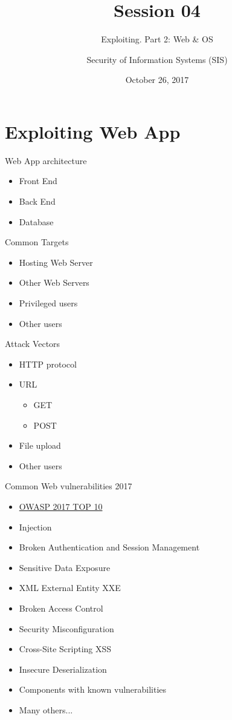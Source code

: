 \documentclass{curs}
\title[Session 04]{Session 04}
\subtitle{Exploiting. Part 2: Web \& OS}
\author{Security of Information Systems (SIS)}
\date{October 26, 2017}
\begin{document}
\frame{\titlepage}

\section{Exploiting Web App}

\begin{frame}{Web App architecture}
  \begin{itemize}
    \item Front End
    \item Back End
    \item Database
  \end{itemize}
\end{frame}

\begin{frame}{Common Targets}
  \begin{itemize}
    \item Hosting Web Server
    \item Other Web Servers
    \item Privileged users
    \item Other users
  \end{itemize}
\end{frame}

\begin{frame}{Attack Vectors}
  \begin{itemize}
    \item HTTP protocol
    \item URL
      \begin{itemize}
        \item GET
        \item POST
      \end{itemize}
    \item File upload
    \item Other users
  \end{itemize}
\end{frame}

\begin{frame}{Common Web vulnerabilities 2017}
  \begin{itemize}
    \item \href{https://github.com/OWASP/Top10/blob/master/2017/}{OWASP 2017 TOP 10}
    \item Injection
    \item Broken Authentication and Session Management
    \item Sensitive Data Exposure
    \item XML External Entity XXE
    \item Broken Access Control
    \item Security Misconfiguration
    \item Cross-Site Scripting XSS
    \item Insecure Deserialization
    \item Components with known vulnerabilities
    \item Many others...
  \end{itemize}
\end{frame}
\end{document}
